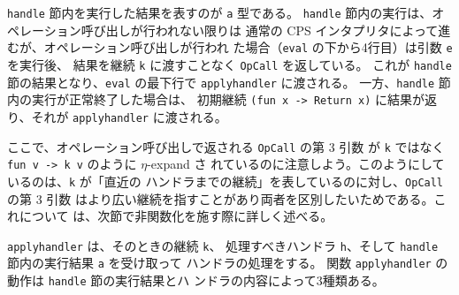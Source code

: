 
\texttt{handle} 節内を実行した結果を表すのが \texttt{a} 型である。
\texttt{handle} 節内の実行は、オペレーション呼び出しが行われない限りは
通常の CPS インタプリタによって進むが、オペレーション呼び出しが行われ
た場合（\texttt{eval} の下から4行目）は引数 \texttt{e} を実行後、
結果を継続 \texttt{k} に渡すことなく \texttt{OpCall} を返している。
これが \texttt{handle} 節の結果となり、\texttt{eval} の最下行で
\texttt{apply\US handler} に渡される。
一方、\texttt{handle} 節内の実行が正常終了した場合は、
初期継続 \texttt{(fun x -> Return x)} に結果が返り、それが
\texttt{apply\US handler} に渡される。

ここで、オペレーション呼び出しで返される \texttt{OpCall} の第 3 引数
が \texttt{k} ではなく \texttt{fun v -> k v} のように $\eta$-expand さ
れているのに注意しよう。このようにしているのは、\texttt{k} が「直近の
ハンドラまでの継続」を表しているのに対し、\texttt{OpCall} の第 3 引数
はより広い継続を指すことがあり両者を区別したいためである。これについて
は、次節で非関数化を施す際に詳しく述べる。

\texttt{apply\US handler} は、そのときの継続 \texttt{k}、
処理すべきハンドラ \texttt{h}、そして
\texttt{handle} 節内の実行結果 \texttt{a} を受け取って
ハンドラの処理をする。
関数 \texttt{apply\US handler} の動作は \texttt{handle} 節の実行結果とハ
ンドラの内容によって3種類ある。



